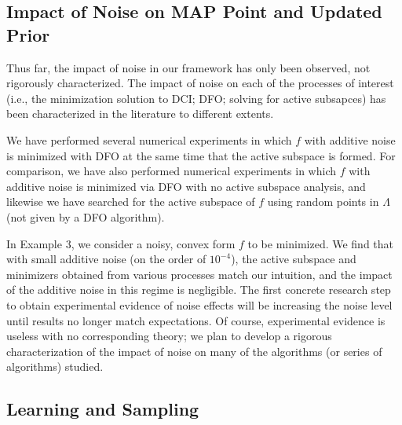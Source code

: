 \documentclass{amsart}
\begin{document}
\subsection{Impact of Noise on MAP Point and Updated Prior}

Thus far, the impact of noise in our framework has only been observed, not rigorously characterized. The impact of noise on each of the processes of interest (i.e., the minimization solution to DCI; DFO; solving for active subsapces) has been characterized in the literature to different extents. 

We have performed several numerical experiments in which $f$ with additive noise is minimized with DFO at the same time that the active subspace is formed. For comparison, we have also performed numerical experiments in which $f$ with additive noise is minimized via DFO with no active subspace analysis, and likewise we have searched for the active subspace of $f$ using random points in $\Lambda$ (not given by a DFO algorithm).

In Example 3, we consider a noisy, convex form $f$ to be minimized. We find that with small additive noise (on the order of $10^{-4}$), the active subspace and minimizers obtained from various processes match our intuition, and the impact of the additive noise in this regime is negligible. The first concrete research step to obtain experimental evidence of noise effects will be increasing the noise level until results no longer match expectations. Of course, experimental evidence is useless with no corresponding theory; we plan to develop a rigorous characterization of the impact of noise on many of the algorithms (or series of algorithms) studied.



\subsection{Learning and Sampling}
\end{document}
